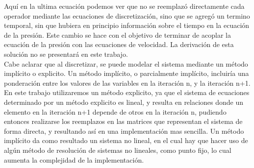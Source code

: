 \begin{minipage}{\linewidth}
Aquí en la ultima ecuación podemos ver que no se reemplazó directamente cada operador mediante las ecuaciones de discretización, sino que se agregó un termino temporal, sin que hubiera en principio información sobre el tiempo en la ecuación de la presión. Este cambio se hace con el objetivo de terminar de acoplar la ecuación de la presión con las ecuaciones de velocidad. La derivación de esta solución no se presentará en este trabajo.
~\\

Cabe aclarar que al discretizar, se puede modelar el sistema mediante un método implícito o explicito. Un método implícito, o parcialmente implícito, incluiría una ponderación entre los valores de las variables en la iteración n, y la iteración n+1. En este trabajo utilizaremos un método explicito, ya que el sistema de ecuaciones determinado por un método explicito es lineal, y resulta en relaciones donde un elemento en la iteración n+1 depende de otros en la iteración n, pudiendo entonces realizarse los reemplazos en las matrices que representan el sistema de forma directa, y resultando así en una implementación mas sencilla. Un método implícito da como resultado un sistema no lineal, en el cual hay que hacer uso de algún método de resolución de sistemas no lineales, como punto fijo, lo cual aumenta la complejidad de la implementación.

\end{minipage}



